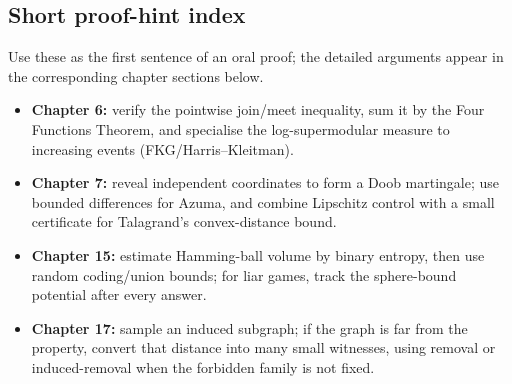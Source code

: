 \documentclass[10pt]{article}
\newcommand{\1}{\mathbf 1}
\begin{document}
\subsection*{Short proof-hint index}
Use these as the first sentence of an oral proof; the detailed arguments appear
in the corresponding chapter sections below.
\begin{itemize}
\item \textbf{Chapter 6:} verify the pointwise join/meet inequality, sum it by
the Four Functions Theorem, and specialise the log-supermodular measure to
increasing events (FKG/Harris--Kleitman).
\item \textbf{Chapter 7:} reveal independent coordinates to form a Doob
martingale; use bounded differences for Azuma, and combine Lipschitz control
with a small certificate for Talagrand's convex-distance bound.
\item \textbf{Chapter 15:} estimate Hamming-ball volume by binary entropy,
then use random coding/union bounds; for liar games, track the sphere-bound
potential after every answer.
\item \textbf{Chapter 17:} sample an induced subgraph; if the graph is far from
the property, convert that distance into many small witnesses, using removal
or induced-removal when the forbidden family is not fixed.
\end{itemize}
\end{document}
